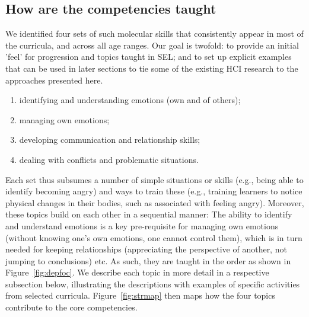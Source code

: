 \documentclass[prodmode,acmtochi]{acmsmall}
\begin{document}
\subsection{How are the competencies taught}
We identified four sets of such molecular skills that consistently appear in most of the curricula, and across all age ranges. Our goal is twofold: to provide an initial 'feel' for progression and topics taught in SEL; and to set up explicit examples that can be used in later sections to tie some of the existing HCI research to the approaches presented here.


\begin{enumerate}
        \item identifying and understanding emotions (own and of others);
        \item managing own emotions;
        \item developing communication and relationship skills;
        \item dealing with conflicts and problematic situations.
\end{enumerate}
 
Each set thus subsumes a number of simple situations or skills (e.g., being able to identify becoming angry) and ways to train these (e.g., training learners to notice physical changes in their bodies, such as associated with feeling angry).
Moreover, these topics build on each other in a sequential manner: The ability to identify and understand emotions is a key pre-requisite for managing own emotions (without knowing one's own emotions, one cannot control them), which is in turn needed for keeping relationships (appreciating the perspective of another, not jumping to conclusions) etc. As such, they are taught in the order as shown in Figure~\ref{fig:depfoc}. 
%
We describe each topic in more detail in a respective subsection below, illustrating the descriptions with examples of specific activities from selected curricula.  Figure~\ref{fig:strmap} then maps how the four topics contribute to the core competencies. 
\end{document}
